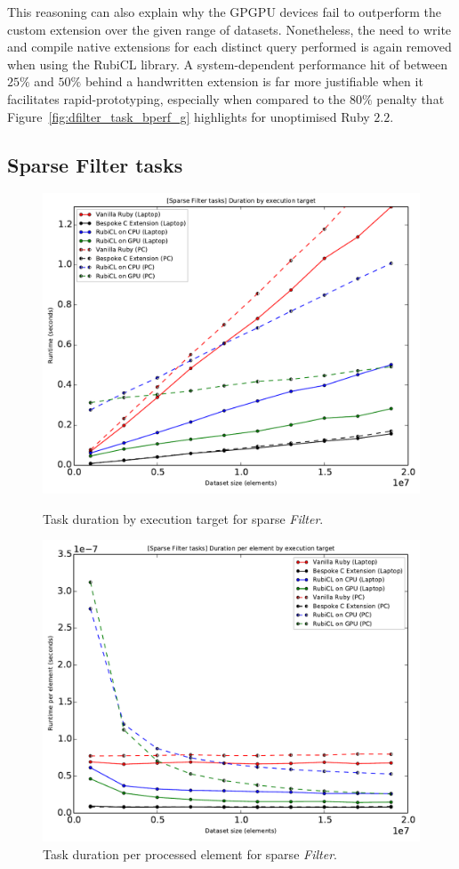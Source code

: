 This reasoning can also explain why the \ac{GPGPU} devices fail to outperform the custom extension over the given range of datasets.
Nonetheless, the need to write and compile native extensions for each distinct query performed is again removed when using the RubiCL library. A system-dependent performance hit of between $25\%$ and $50\%$ behind a handwritten extension is far more justifiable when it facilitates rapid-prototyping, especially when compared to the $80\%$ penalty that Figure~\ref{fig:dfilter_task_bperf_g} highlights for unoptimised Ruby $2.2$.

\subsection{Sparse Filter tasks}
\begin{figure}[H]
  \centering
  \includegraphics[width=\textwidth]{./graphing/sparse_filter/runtimes.pdf}
  \caption{Task duration by execution target for sparse \emph{Filter}.}
  \label{fig:sfilter_task_runtime_g}

  \includegraphics[width=\textwidth]{./graphing/sparse_filter/per_element.pdf}
  \caption{Task duration per processed element for sparse \emph{Filter}.}
  \label{fig:sfilter_task_per_el_g}

\end{figure}

